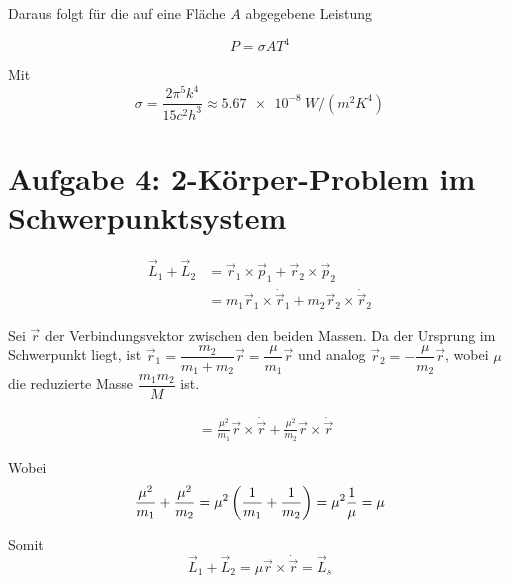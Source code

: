 \documentclass[a4paper,german,12pt,smallheadings]{scrartcl}
\begin{document}
Daraus folgt für die auf eine Fläche $A$ abgegebene Leistung

\begin{equation}
  P = \sigma A T^4
\end{equation}

Mit
\begin{equation}
  \sigma = \frac{2 \pi^5 k^4}{15 c^2 h^3} \approx \SI{5.67e-8}{W/(m^2 K^4)}
\end{equation}

\section*{Aufgabe 4: 2-Körper-Problem im Schwerpunktsystem}

\begin{align*}
  \vec{L}_1 + \vec{L}_2
  &= \vec{r}_1 \times \vec{p}_1 + \vec{r}_2 \times \vec{p}_2 \\
  &= m_1 \vec{r}_1 \times \dot{\vec{r}}_1 +
   m_2 \vec{r}_2 \times \dot{\vec{r}}_2
\end{align*}

Sei $\vec{r}$ der Verbindungsvektor zwischen den beiden Massen. Da der Ursprung
im Schwerpunkt liegt, ist $\vec{r}_1 = \dfrac{m_2}{m_1 + m_2} \vec{r} =
\dfrac{\mu}{m_1} \vec{r}$ und analog $\vec{r}_2 = -\dfrac{\mu}{m_2} \vec{r}$,
wobei $\mu$ die reduzierte Masse $\dfrac{m_1 m_2}{M}$ ist.

\begin{align*}
  &= \frac{\mu^2}{m_1} \vec{r} \times \dot{\vec{r}} + \frac{\mu^2}{m_2} \vec{r} \times \dot{\vec{r}}
\end{align*}

Wobei
\begin{align*}
  \frac{\mu^2}{m_1} + \frac{\mu^2}{m_2} = \mu^2 \del{\frac{1}{m_1} + \frac{1}{m_2}} = \mu^2 \frac{1}{\mu} = \mu
\end{align*}

Somit
\begin{equation}
  \vec{L}_1 + \vec{L}_2 = \mu \vec{r} \times \dot{\vec{r}} = \vec{L}_s
\end{equation}
\end{document}
